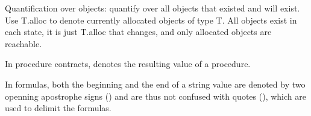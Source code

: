 Quantification over objects: quantify over all objects that
existed and will exist.  Use T.alloc to denote currently
allocated objects of type T.  All objects exist in each state,
it is just T.alloc that changes, and only allocated objects
are reachable.

In procedure contracts,  denotes the resulting value of a
procedure.

In formulas, both the beginning and the end of a string
value are denoted by two openning apostrophe signs ()
and are thus not confused with quotes (), which are
used to delimit the formulas.

